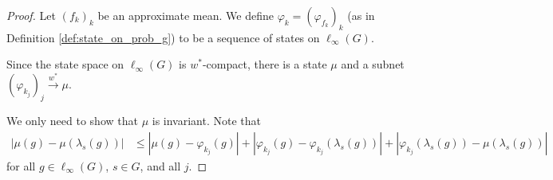 \begin{proof}
  Let $\left(f_k\right)_k$ be an approximate mean. We define $\varphi_k = \left(\varphi_{f_k}\right)_k$ (as in Definition \ref{def:state_on_prob_g}) to be a sequence of states on $\ell_{\infty}\left(G\right)$.\newline

  Since the state space on $\ell_{\infty}\left(G\right)$ is $w^{\ast}$-compact, there is a state $\mu$ and a subnet $\left(\varphi_{k_j}\right)_j \xrightarrow{w^{\ast}}\mu$. \newline

  We only need to show that $\mu$ is invariant. Note that
  \begin{align*}
    \left\vert \mu\left(g\right) - \mu\left(\lambda_s\left(g\right)\right) \right\vert &\leq \left\vert \mu\left(g\right) - \varphi_{k_j}\left(g\right) \right\vert + \left\vert \varphi_{k_j}\left(g\right) - \varphi_{k_j}\left(\lambda_s\left(g\right)\right) \right\vert + \left\vert \varphi_{k_j}\left(\lambda_s\left(g\right)\right) - \mu\left(\lambda_s\left(g\right)\right) \right\vert
  \end{align*}
  for all $g\in \ell_{\infty}\left(G\right)$, $s\in G$, and all $j$.\newline


\end{proof}
